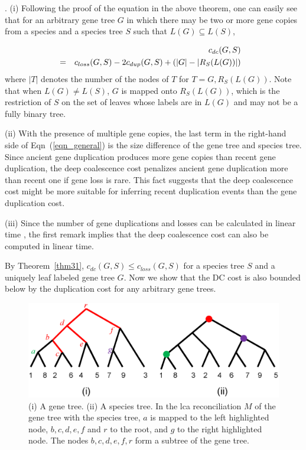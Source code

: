 \documentclass[9.5pt,journal,letterpaper,compsoc]{IEEEtran}
\begin{document}
. (i) Following the proof of the equation in
the above theorem, one can easily see that for an arbitrary gene
tree $G$ in which there may be two or more gene copies from a
species and a species tree $S$ such that $L(G)\subseteq L(S)$,

\begin{eqnarray}
\hspace{-1em} && c_{dc}(G, S) \nonumber \\
\hspace{-1em} &=& c_{loss}(G, S) - 2c_{dup}(G, S) +
\left(|G|-|R_S(L(G))|\right) \label{eqn_general}
\end{eqnarray}
 where $|T|$ denotes the number of
the nodes of $T$ for $T=G, R_{S}(L(G))$.  Note that when $L(G)\neq
L(S)$, $G$ is mapped onto $R_{S}(L(G))$, which is the restriction of
$S$ on the set of leaves whose labels are in $L(G)$
and may not be a fully binary tree.

(ii) With the presence of multiple gene copies, the last term in the
right-hand side of  Eqn~(\ref{eqn_general}) is the size difference
of the gene tree and species tree. Since ancient gene duplication
produces more gene copies than recent gene duplication, the deep
coalescence cost penalizes ancient gene duplication more than recent
one if gene loss is rare. This fact suggests that the deep
coalescence cost might be more suitable for inferring recent
duplication events than the gene duplication cost.

(iii) Since the number of gene  duplications and losses can be
calculated in linear time \cite{Zh97, Ma_SIAMComput_01}, the first
remark implies that the deep coalescence cost can also be computed
in linear time.


 By Theorem~\ref{thm31}, $c_{dc}(G, S)\leq c_{loss}(G, S)$ for a species tree $S$
and a uniquely leaf labeled gene tree $G$. Now we show that the DC
cost is also  bounded below by the duplication cost for any
arbitrary gene trees.

\begin{figure}
\begin{center}
\includegraphics[width=0.9\columnwidth]{Figure2}
\end{center}
\caption{(i) A gene tree. (ii) A species tree. In the lca  reconciliation $M$
  of the gene tree with the species tree,   $a$ is mapped to the
left highlighted node,
$b, c, d, e, f$ and $r$ to the root, and $g$ to the right highlighted node.
The nodes $b, c, d, e, f, r$ form a subtree of the gene tree.}
\label{GeneTreePartition}
\end{figure}
\end{document}
